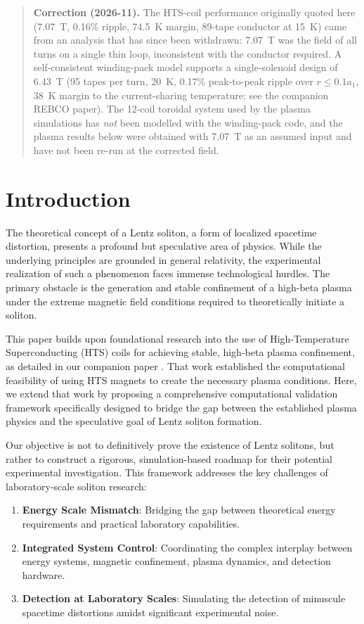 \documentclass[12pt,a4paper]{article}
\begin{document}
\begin{quote}\small
\textbf{Correction (2026-11).} The HTS-coil performance originally quoted here (7.07~T, 0.16\% ripple, 74.5~K margin, 89-tape conductor at 15~K) came from an analysis that has since been withdrawn: 7.07~T was the field of all turns on a single thin loop, inconsistent with the conductor required. A self-consistent winding-pack model supports a single-solenoid design of 6.43~T (95 tapes per turn, 20~K, 0.17\% peak-to-peak ripple over $r\le0.1a_1$, 38~K margin to the current-sharing temperature; see the companion REBCO paper). The 12-coil toroidal system used by the plasma simulations has \emph{not} been modelled with the winding-pack code, and the plasma results below were obtained with 7.07~T as an assumed input and have not been re-run at the corrected field.
\end{quote}


\section{Introduction}

The theoretical concept of a Lentz soliton, a form of localized spacetime distortion, presents a profound but speculative area of physics. While the underlying principles are grounded in general relativity, the experimental realization of such a phenomenon faces immense technological hurdles. The primary obstacle is the generation and stable confinement of a high-beta plasma under the extreme magnetic field conditions required to theoretically initiate a soliton.

This paper builds upon foundational research into the use of High-Temperature Superconducting (HTS) coils for achieving stable, high-beta plasma confinement, as detailed in our companion paper \cite{HTSPlasmaConfinement2025}. That work established the computational feasibility of using HTS magnets to create the necessary plasma conditions. Here, we extend that work by proposing a comprehensive computational validation framework specifically designed to bridge the gap between the established plasma physics and the speculative goal of Lentz soliton formation.

Our objective is not to definitively prove the existence of Lentz solitons, but rather to construct a rigorous, simulation-based roadmap for their potential experimental investigation. This framework addresses the key challenges of laboratory-scale soliton research:
\begin{enumerate}
    \item \textbf{Energy Scale Mismatch}: Bridging the gap between theoretical energy requirements and practical laboratory capabilities.
    \item \textbf{Integrated System Control}: Coordinating the complex interplay between energy systems, magnetic confinement, plasma dynamics, and detection hardware.
    \item \textbf{Detection at Laboratory Scales}: Simulating the detection of minuscule spacetime distortions amidst significant experimental noise.
\end{enumerate}
\end{document}
